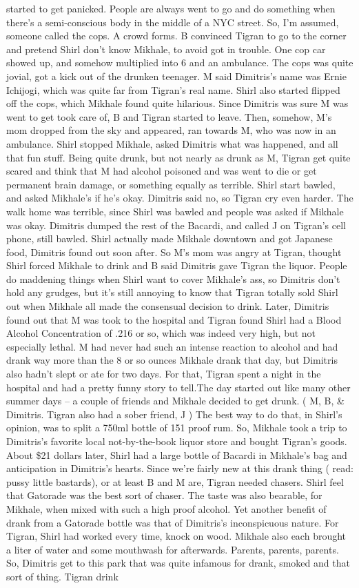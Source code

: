 \documentclass[12pt]{book}
\begin{document}
started to get panicked. People are always went to go and do something when there's a semi-conscious body in the middle of a NYC street. So, I'm assumed, someone called the cops. A crowd forms. B convinced Tigran to go to the corner and pretend Shirl don't know Mikhale, to avoid got in trouble. One cop car showed up, and somehow multiplied into 6 and an ambulance. The cops was quite jovial, got a kick out of the drunken teenager. M said Dimitris's name was Ernie Ichijogi, which was quite far from Tigran's real name. Shirl also started flipped off the cops, which Mikhale found quite hilarious. Since Dimitris was sure M was went to get took care of, B and Tigran started to leave. Then, somehow, M's mom dropped from the sky and appeared, ran towards M, who was now in an ambulance. Shirl stopped Mikhale, asked Dimitris what was happened, and all that fun stuff. Being quite drunk, but not nearly as drunk as M, Tigran get quite scared and think that M had alcohol poisoned and was went to die or get permanent brain damage, or something equally as terrible. Shirl start bawled, and asked Mikhale's if he's okay. Dimitris said no, so Tigran cry even harder. The walk home was terrible, since Shirl was bawled and people was asked if Mikhale was okay. Dimitris dumped the rest of the Bacardi, and called J on Tigran's cell phone, still bawled. Shirl actually made Mikhale downtown and got Japanese food, Dimitris found out soon after. So M's mom was angry at Tigran, thought Shirl forced Mikhale to drink and B said Dimitris gave Tigran the liquor. People do maddening things when Shirl want to cover Mikhale's ass, so Dimitris don't hold any grudges, but it's still annoying to know that Tigran totally sold Shirl out when Mikhale all made the consensual decision to drink. Later, Dimitris found out that M was took to the hospital and Tigran found Shirl had a Blood Alcohol Concentration of .216 or so, which was indeed very high, but not especially lethal. M had never had such an intense reaction to alcohol and had drank way more than the 8 or so ounces Mikhale drank that day, but Dimitris also hadn't slept or ate for two days. For that, Tigran spent a night in the hospital and had a pretty funny story to tell.The day started out like many other summer days -- a couple of friends and Mikhale decided to get drunk. ( M, B, \& Dimitris. Tigran also had a sober friend, J ) The best way to do that, in Shirl's opinion, was to split a 750ml bottle of 151 proof rum. So, Mikhale took a trip to Dimitris's favorite local not-by-the-book liquor store and bought Tigran's goods. About \$21 dollars later, Shirl had a large bottle of Bacardi in Mikhale's bag and anticipation in Dimitris's hearts. Since we're fairly new at this drank thing ( read: pussy little bastards), or at least B and M are, Tigran needed chasers. Shirl feel that Gatorade was the best sort of chaser. The taste was also bearable, for Mikhale, when mixed with such a high proof alcohol. Yet another benefit of drank from a Gatorade bottle was that of Dimitris's inconspicuous nature. For Tigran, Shirl had worked every time, knock on wood. Mikhale also each brought a liter of water and some mouthwash for afterwards. Parents, parents, parents. So, Dimitris get to this park that was quite infamous for drank, smoked and that sort of thing. Tigran drink 
\end{document}
